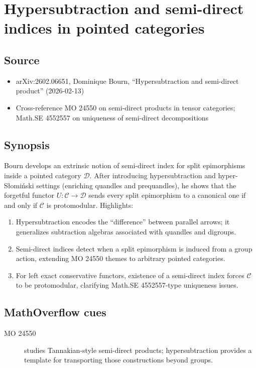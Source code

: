 \section*{Hypersubtraction and semi-direct indices in pointed categories}
\subsection*{Source}
\begin{itemize}
  \item arXiv:2602.06651, Dominique Bourn, ``Hypersubtraction and semi-direct product'' (2026-02-13)
  \item Cross-reference MO 24550 on semi-direct products in tensor categories; Math.SE 4552557 on uniqueness of semi-direct decompositions
\end{itemize}
\subsection*{Synopsis}
Bourn develops an extrinsic notion of semi-direct index for split epimorphisms inside a pointed category $\mathcal{D}$. After introducing hypersubtraction and hyper-S{\l}omi\'nski settings (enriching quandles and prequandles), he shows that the forgetful functor $U:\mathcal{C}\to\mathcal{D}$ sends every split epimorphism to a canonical one if and only if $\mathcal{C}$ is protomodular. Highlights:
\begin{enumerate}
  \item Hypersubtraction encodes the ``difference'' between parallel arrows; it generalizes subtraction algebras associated with quandles and digroups.
  \item Semi-direct indices detect when a split epimorphism is induced from a group action, extending MO 24550 themes to arbitrary pointed categories.
  \item For left exact conservative functors, existence of a semi-direct index forces $\mathcal{C}$ to be protomodular, clarifying Math.SE 4552557-type uniqueness issues.
\end{enumerate}
\subsection*{MathOverflow cues}
\begin{description}
  \item[MO 24550] studies Tannakian-style semi-direct products; hypersubtraction provides a template for transporting those constructions beyond groups.
\end{description}
